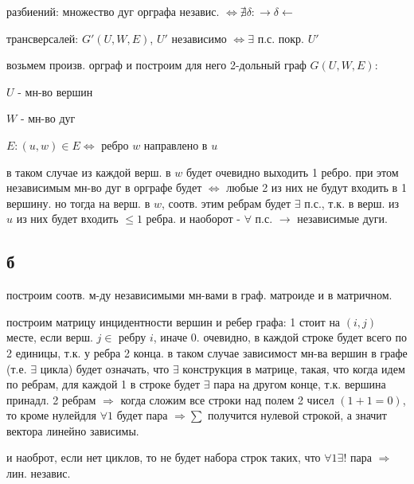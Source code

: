 \documentclass[russian]{article}
\begin{document}
разбиений: множество дуг орграфа независ. $\iff \nexists \delta : \to \delta \leftarrow$

трансверсалей: $G'(U,W,E)$, $U'$ независимо $\iff \exists $ п.с. покр. $U'$

возьмем произв. орграф и построим для него 2-дольный граф $G(U,W,E)$:

$U$ - мн-во вершин

$W$ - мн-во дуг

$E:(u,w) \in E \iff $ ребро $w$ направлено в $u$

в таком случае из каждой верш. в $w$ будет очевидно выходить 1 ребро. при этом независимым мн-во дуг в орграфе будет $\iff$ любые 2 из них не будут входить в 1 вершину. но тогда на верш. в $w$, соотв. этим ребрам будет $\exists$ п.с., т.к. в верш. из $u$ из них будет входить $\le 1$ ребра. и наоборот - $\forall$ п.с. $\to$ независимые дуги.

\subsection*{б}

построим соотв. м-ду независимыми мн-вами в граф. матроиде и в матричном.

построим матрицу инцидентности вершин и ребер графа: 1 стоит на $(i,j)$ месте, если верш. $j \in $ ребру $i$, иначе 0. очевидно, в каждой строке будет всего по 2 единицы, т.к. у ребра 2 конца. в таком случае зависимост мн-ва вершин в графе (т.е. $\exists$ цикла) будет означать, что $\exists$ конструкция в матрице, такая, что когда идем по ребрам, для каждой 1 в строке будет $\exists$ пара на другом конце, т.к. вершина принадл. 2 ребрам $\Rightarrow$ когда сложим все строки над полем 2 чисел $(1+1=0)$, то  кроме нулейдля $\forall 1$ будет пара $\Rightarrow \sum$ получится нулевой строкой, а значит вектора линейно зависимы.

и наоброт, если нет циклов, то не будет набора строк таких, что $\forall 1 \exists ! $ пара $\Rightarrow $ лин. независ.
\end{document}
